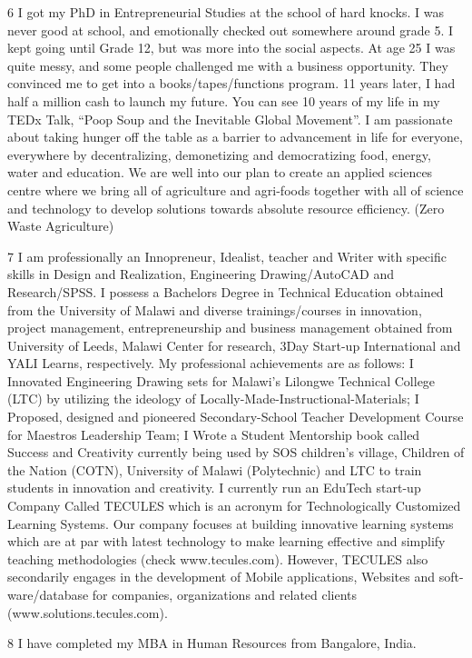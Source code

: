 \documentclass[12pt, titlepage]{article}
\begin{document}
6 I got my PhD in Entrepreneurial Studies at the school of hard knocks.
I was never good at school, and emotionally checked out somewhere around
grade 5. I kept going until Grade 12, but was more into the social
aspects. At age 25 I was quite messy, and some people challenged me with
a business opportunity. They convinced me to get into a
books/tapes/functions program. 11 years later, I had half a million cash
to launch my future. You can see 10 years of my life in my TEDx Talk,
``Poop Soup and the Inevitable Global Movement''. I am passionate about
taking hunger off the table as a barrier to advancement in life for
everyone, everywhere by decentralizing, demonetizing and democratizing
food, energy, water and education. We are well into our plan to create
an applied sciences centre where we bring all of agriculture and
agri-foods together with all of science and technology to develop
solutions towards absolute resource efficiency. (Zero Waste Agriculture)

7 I am professionally an Innopreneur, Idealist, teacher and Writer with
specific skills in Design and Realization, Engineering Drawing/AutoCAD
and Research/SPSS. I possess a Bachelors Degree in Technical Education
obtained from the University of Malawi and diverse trainings/courses in
innovation, project management, entrepreneurship and business management
obtained from University of Leeds, Malawi Center for research, 3Day
Start-up International and YALI Learns, respectively. My professional
achievements are as follows: I Innovated Engineering Drawing sets for
Malawi's Lilongwe Technical College (LTC) by utilizing the ideology of
Locally-Made-Instructional-Materials; I Proposed, designed and pioneered
Secondary-School Teacher Development Course for Maestros Leadership
Team; I Wrote a Student Mentorship book called Success and Creativity
currently being used by SOS children's village, Children of the Nation
(COTN), University of Malawi (Polytechnic) and LTC to train students in
innovation and creativity. I currently run an EduTech start-up Company
Called TECULES which is an acronym for Technologically Customized
Learning Systems. Our company focuses at building innovative learning
systems which are at par with latest technology to make learning
effective and simplify teaching methodologies (check www.tecules.com).
However, TECULES also secondarily engages in the development of Mobile
applications, Websites and soft-ware/database for companies,
organizations and related clients (www.solutions.tecules.com).

8 I have completed my MBA in Human Resources from Bangalore, India.
\end{document}
